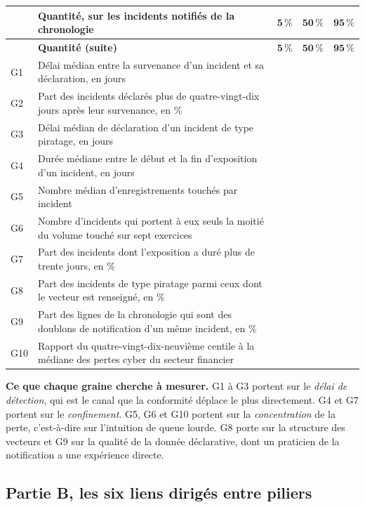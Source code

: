 {\small
\renewcommand{\arraystretch}{1.22}
\begin{longtable}{@{}l p{8.0cm} c c c@{}}
\toprule
& \textbf{Quantité, sur les incidents notifiés de la chronologie} & $\mathbf{5\,\%}$ &
$\mathbf{50\,\%}$ & $\mathbf{95\,\%}$ \\
\midrule
\endfirsthead
\toprule
& \textbf{Quantité (suite)} & $\mathbf{5\,\%}$ & $\mathbf{50\,\%}$ & $\mathbf{95\,\%}$ \\
\midrule
\endhead
G1 & Délai médian entre la survenance d'un incident et sa déclaration, en jours & & & \\
G2 & Part des incidents déclarés plus de quatre-vingt-dix jours après leur survenance,
     en \% & & & \\
G3 & Délai médian de déclaration d'un incident de type piratage, en jours & & & \\
G4 & Durée médiane entre le début et la fin d'exposition d'un incident, en jours & & & \\
G5 & Nombre médian d'enregistrements touchés par incident & & & \\
G6 & Nombre d'incidents qui portent à eux seuls la moitié du volume touché
     sur sept exercices & & & \\
G7 & Part des incidents dont l'exposition a duré plus de trente jours, en \% & & & \\
G8 & Part des incidents de type piratage parmi ceux dont le vecteur est renseigné,
     en \% & & & \\
G9 & Part des lignes de la chronologie qui sont des doublons de notification d'un même
     incident, en \% & & & \\
G10 & Rapport du quatre-vingt-dix-neuvième centile à la médiane des pertes cyber du
      secteur financier & & & \\
\bottomrule
\end{longtable}}

\vspace{2pt}
\noindent\textbf{Ce que chaque graine cherche à mesurer.} G1 à G3 portent sur le \emph{délai de
détection}, qui est le canal que la conformité déplace le plus directement. G4 et G7 portent sur
le \emph{confinement}. G5, G6 et G10 portent sur la \emph{concentration} de la perte, c'est-à-dire
sur l'intuition de queue lourde. G8 porte sur la structure des vecteurs et G9 sur la qualité de la
donnée déclarative, dont un praticien de la notification a une expérience directe.

\subsection*{Partie B, les six liens dirigés entre piliers}

